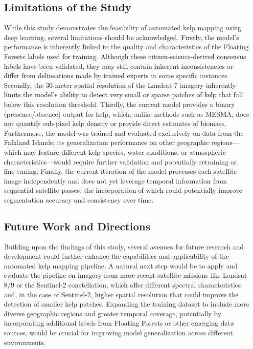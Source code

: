 \documentclass{article}
\begin{document}
\subsection{Limitations of the Study}

While this study demonstrates the feasibility of automated kelp mapping using deep learning, several limitations should be acknowledged. Firstly, the model's performance is inherently linked to the quality and characteristics of the Floating Forests labels used for training. Although these citizen-science-derived consensus labels have been validated, they may still contain inherent inconsistencies or differ from delineations made by trained experts in some specific instances. Secondly, the 30-meter spatial resolution of the Landsat 7 imagery inherently limits the model's ability to detect very small or sparse patches of kelp that fall below this resolution threshold. Thirdly, the current model provides a binary (presence/absence) output for kelp, which, unlike methods such as MESMA, does not quantify sub-pixel kelp density or provide direct estimates of biomass. Furthermore, the model was trained and evaluated exclusively on data from the Falkland Islands; its generalization performance on other geographic regions—which may feature different kelp species, water conditions, or atmospheric characteristics—would require further validation and potentially retraining or fine-tuning. Finally, the current iteration of the model processes each satellite image independently and does not yet leverage temporal information from sequential satellite passes, the incorporation of which could potentially improve segmentation accuracy and consistency over time.

\subsection{Future Work and Directions}

Building upon the findings of this study, several avenues for future research and development could further enhance the capabilities and applicability of the automated kelp mapping pipeline. A natural next step would be to apply and evaluate the pipeline on imagery from more recent satellite missions like Landsat 8/9 or the Sentinel-2 constellation, which offer different spectral characteristics and, in the case of Sentinel-2, higher spatial resolution that could improve the detection of smaller kelp patches. Expanding the training dataset to include more diverse geographic regions and greater temporal coverage, potentially by incorporating additional labels from Floating Forests or other emerging data sources, would be crucial for improving model generalization across different environments. 
\end{document}

